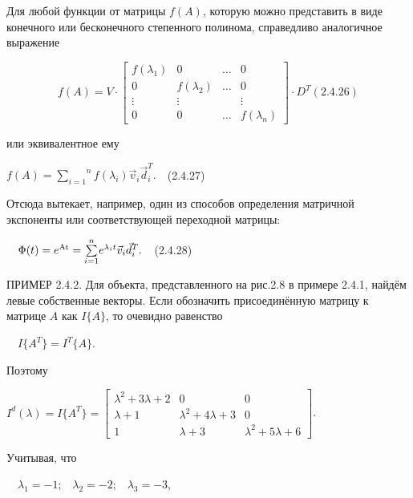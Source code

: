 		Для любой функции от матрицы  $f(A)$, которую можно представить в виде конечного или бесконечного степенного полинома,
		справедливо аналогичное выражение



\begin{equation}\label{key}
	f(A)=V\cdot \left[\begin{matrix}f(\lambda_{1})&0&\ldots &0\\0&f(\lambda_{2})&\ldots &0\\\vdots &\vdots &&\vdots \\0&0&\ldots
		&f(\lambda_{n})\end{matrix}\right]\cdot D^{T}(2.4.26)
\end{equation}



		или эквивалентное ему



		   $f(A)=\overset n{\underset{i=1}{\sum }}f(\lambda _i)\vec v_i\vec d_i^T.$\ \ (2.4.27)



		Отсюда вытекает, например, один из способов определения матричной экспоненты или соответствующей переходной матрицы:



		\ \  $\Phi (t)=e^{\normalsubformula{\text{At}}}=\overset n{\underset{i=1}{\sum }}e^{\lambda _it}\vec v_i\vec d_i^T.$\ \ (2.4.28)



\bigskip


		ПРИМЕР 2.4.2. Для объекта, представленного на рис.2.8 в примере 2.4.1, найдём левые собственные векторы. Если обозначить
		присоединённую матрицу к матрице  $A$ как  $I\{A\}$, то очевидно равенство 



		\ \  $I\{A^T\}=I^T\{A\}$.



		Поэтому



		$I^d(\lambda )=I\{A^T\}=\left[\begin{matrix}\lambda ^2+3\lambda +2&0&0\\\lambda +1&\lambda ^2+4\lambda +3&0\\1&\lambda +3&\lambda ^2+5\lambda +6\end{matrix}\right]$.



		Учитывая, что



		\ \  $\lambda _1=-1;\;\;\;\lambda _2=-2;\;\;\;\lambda _3=-3$,



